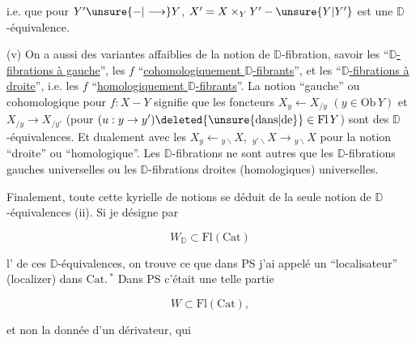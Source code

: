
i.e.  que pour  $Y'\unsure{-|\longrightarrow}Y$, $X'=X\times_Y Y' - \unsure{Y|Y'}$ est une $\mathbb D$-équivalence.

(v) On a aussi des variantes affaiblies de la notion de $\mathbb D$-fibration, savoir les ``\uline{$\mathbb D$-fibrations à gauche}'', les $f$ ``\uline{cohomologiquement $\mathbb D$-fibrants}'', et les ``\uline{$\mathbb D$-fibrations à droite}'', i.e. les $f$ ``\uline{homologiquement $\mathbb D$-fibrants}''.  La notion ``gauche'' ou cohomologique pour $f:X - Y$ signifie que les foncteurs $X_y\leftarrow X_{/y}$ $(y\in\mathrm{Ob}\,Y)$ et $X_{/y}\longrightarrow X_{/y'}$ (pour $(u:y\to y')\deleted{\unsure{\mathrm{dans}|\mathrm{de}}}\in\mathrm{Fl}\,Y$) sont des $\mathbb D$-équivalences. Et dualement  avec les $X_y\leftarrow {}_{y\backslash}X$, $\,{}_{y'\backslash}X\longrightarrow {}_{y\backslash}X$ pour la notion ``droite'' ou ``homologique''. Les $\mathbb D$-fibrations ne sont autres que les $\mathbb D$-fibrations gauches  universelles ou les $\mathbb D$-fibrations droites (homologiques) universelles.


Finalement, toute cette kyrielle de notions se déduit de la seule notion de $\mathbb D$-équivalences (ii). Si je désigne par

\[ W_{\mathbb D}\subset\mathrm{Fl}(\mathrm{Cat}) \]

l' de ces $\mathbb D$-équivalences, on trouve ce que dans PS j'ai appelé un ``localisateur'' (localizer) dans $\mathrm{Cat}$.$\,{}^{*}$ Dans PS c'était une telle partie

\[ W\subset\mathrm{Fl}(\mathrm{Cat}), \]

et non  la donnée d'un dérivateur, qui

